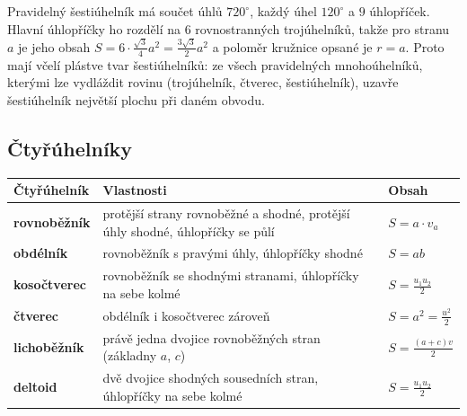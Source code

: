 \begin{example}
  Pravidelný šestiúhelník má součet úhlů $720^\circ$, každý úhel $120^\circ$ a $9$ úhlopříček. Hlavní úhlopříčky ho rozdělí na $6$ rovnostranných trojúhelníků, takže pro stranu $a$ je jeho obsah $S = 6\cdot\frac{\sqrt{3}}{4}a^2 = \frac{3\sqrt{3}}{2}a^2$ a poloměr kružnice opsané je $r = a$. Proto mají včelí plástve tvar šestiúhelníků: ze všech pravidelných mnohoúhelníků, kterými lze vydláždit rovinu (trojúhelník, čtverec, šestiúhelník), uzavře šestiúhelník největší plochu při daném obvodu.
\end{example}

\subsection{Čtyřúhelníky}\label{sec:ctyruhelniky}

\begin{definitionbox}
  \begin{center}
    \renewcommand{\arraystretch}{1.5}
    \begin{tabular}{|l|p{6.4cm}|l|}
      \hline
      Čtyřúhelník & Vlastnosti & Obsah \\
      \hline
      \textbf{rovnoběžník} & protější strany rovnoběžné a shodné, protější úhly shodné, úhlopříčky se půlí & $S = a\cdot v_a$ \\
      \textbf{obdélník} & rovnoběžník s pravými úhly, úhlopříčky shodné & $S = ab$ \\
      \textbf{kosočtverec} & rovnoběžník se shodnými stranami, úhlopříčky na sebe kolmé & $S = \frac{u_1u_2}{2}$ \\
      \textbf{čtverec} & obdélník i kosočtverec zároveň & $S = a^2 = \frac{u^2}{2}$ \\
      \textbf{lichoběžník} & právě jedna dvojice rovnoběžných stran (základny $a$, $c$) & $S = \frac{(a + c)v}{2}$ \\
      \textbf{deltoid} & dvě dvojice shodných sousedních stran, úhlopříčky na sebe kolmé & $S = \frac{u_1u_2}{2}$ \\
      \hline
    \end{tabular}
  \end{center}
\end{definitionbox}

